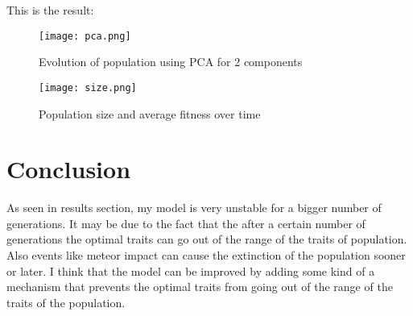 \documentclass{article}
\begin{document}
\begin{itemize}
    {\centering
    This is the result:
    \par}

    \begin{figure}[h] %
        \centering %
        \texttt{[image: pca.png]} %
        \caption{Evolution of population using PCA for 2 components} %
        \label{fig:pca} %
    \end{figure}

    \begin{figure}[h] %
        \centering %
        \texttt{[image: size.png]} %
        \caption{Population size and average fitness over time} %
        \label{fig:size} %
    \end{figure}

\end{itemize}

\newpage

\section{Conclusion}

As seen in results section, my model is very unstable for a bigger number of generations. It may be due to 
the fact that the after a certain number of generations the optimal traits can go out of the range
of the traits of population. Also events like meteor impact can cause the extinction of the population sooner 
or later. I think that the model can be improved by adding some kind of a mechanism that prevents the optimal 
traits from going out of the range of the traits of the population.
\end{document}
